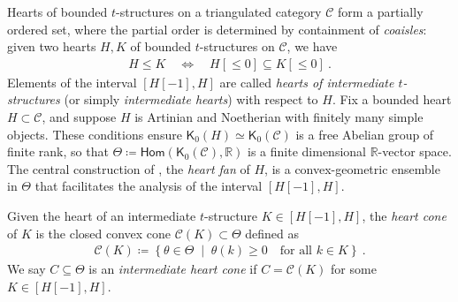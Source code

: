 \documentclass[reqno,a4paper]{amsart}
\newcommand{\calC}{\mathcal{C}}
\newcommand{\R}{\mathbb{R}}
\newcommand{\scrC}{\mathscr{C}}
\newcommand{\sfK}{\mathsf{K}}
\newcommand{\Hom}{\mathsf{Hom}}
\theoremstyle{basic-theorem}
\numberwithin{equation}{section}
\begin{document}
Hearts of bounded $t$-structures on a triangulated category $\scrC$ form a partially ordered set, where the partial order is determined by containment of \textit{coaisles}: given two hearts $H, K$ of bounded $t$-structures on $\scrC$, we have
\begin{align}
	H\leq K \quad \iff \quad H[\leq 0] \subseteq K[\leq 0]\ .
\end{align}
Elements of the interval $[H[-1],H]$ are called \textit{hearts of intermediate $t$-structures} (or simply \textit{intermediate hearts}) with respect to $H$. 
Fix a bounded heart $H\subset \scrC$, and suppose $H$ is Artinian and Noetherian with finitely many simple objects. These conditions ensure $\sfK_0(H)\simeq \sfK_0(\scrC)$ is a free Abelian group of finite rank, so that $\Theta\coloneqq\Hom(\sfK_0(\scrC),\R)$ is a finite dimensional $\R$-vector space. The central construction of \cite{HeartFan}, the \textit{heart fan} of $H$, is a convex-geometric ensemble in $\Theta$ that facilitates the analysis of the interval $[H[-1],H]$.

\begin{definition}
    Given the heart of an intermediate $t$-structure $K\in [H[-1],H]$, the \textit{heart cone} of $K$ is the closed convex cone $\calC(K)\subset \Theta$ defined as
	\begin{align}
		\calC(K) \coloneqq \left\{\theta\in \Theta\;\middle\vert\; \theta(k)\geq 0\quad\text{for all }k\in K\right\}\ .
	\end{align}
    We say $C\subseteq\Theta$ is an \textit{intermediate heart cone} if $C=\calC(K)$ for some $K\in [H[-1],H]$.
\end{definition}
\end{document}
